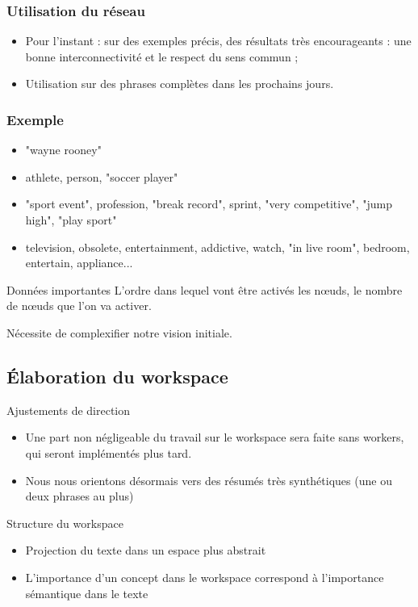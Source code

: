 \documentclass[12pt]{beamer}
\begin{document}
\begin{frame}
\frametitle{Utilisation du réseau}

\begin{itemize}
 \item Pour l'instant : sur des exemples précis, des résultats très encourageants : une bonne interconnectivité et le respect du sens commun ;
 \item Utilisation sur des phrases complètes dans les prochains jours.
\end{itemize}

\end{frame}


\begin{frame}
\frametitle{Exemple}

\begin{itemize}
 \item "wayne rooney"
 \item athlete, person, "soccer player"
 \item "sport event", profession, "break record", sprint, "very competitive", "jump high", "play sport"
 \item television, obsolete, entertainment, addictive, watch, "in live room", bedroom, entertain, appliance...
\end{itemize}

\begin{block}{Données importantes}
L'ordre dans lequel vont être activés les n\oe uds, le nombre de n\oe uds que l'on va activer.

Nécessite de complexifier notre vision initiale.
\end{block}


\end{frame}


\subsection{Élaboration du workspace}
\begin{frame}
  \begin{block}{Ajustements de direction}
    \begin{itemize}
      \item Une part non négligeable du travail sur le workspace sera faite sans workers, qui seront implémentés plus tard.
      \item Nous nous orientons désormais vers des résumés très synthétiques (une ou deux phrases au plus)
    \end{itemize}
  \end{block}

  \begin{block}{Structure du workspace}
   \begin{itemize}
     \item Projection du texte dans un espace plus abstrait
     \item L'importance d'un concept dans le workspace correspond à l'importance sémantique dans le texte
   \end{itemize} 
  \end{block}
\end{frame}
\end{document}
